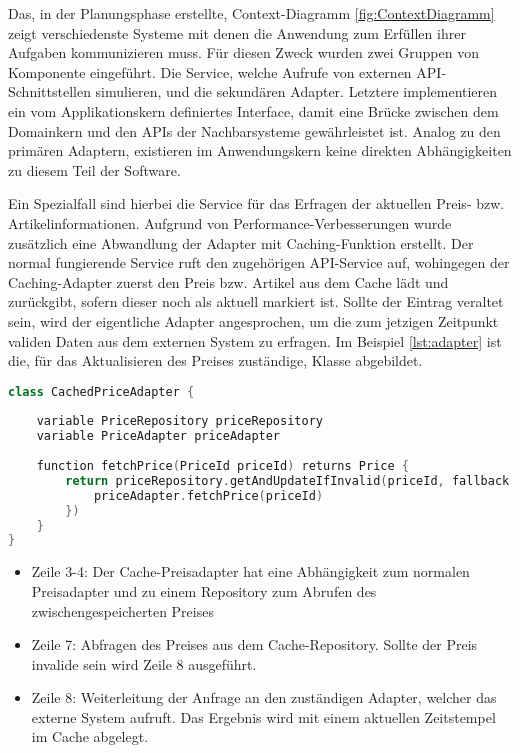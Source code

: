 Das, in der Planungsphase erstellte, Context-Diagramm \ref{fig:ContextDiagramm} zeigt verschiedenste Systeme mit denen die Anwendung zum Erfüllen ihrer Aufgaben kommunizieren muss. Für diesen Zweck wurden zwei Gruppen von Komponente eingeführt. Die Service, welche Aufrufe von externen API-Schnittstellen simulieren, und die sekundären Adapter. Letztere implementieren ein vom Applikationskern definiertes Interface, damit eine Brücke zwischen dem Domainkern und den APIs der Nachbarsysteme gewährleistet ist. Analog zu den primären Adaptern, existieren im Anwendungskern keine direkten Abhängigkeiten zu diesem Teil der Software.

Ein Spezialfall sind hierbei die Service für das Erfragen der aktuellen Preis- bzw. Artikelinformationen. Aufgrund von Performance-Verbesserungen wurde zusätzlich eine Abwandlung der Adapter mit Caching-Funktion erstellt. Der normal fungierende Service ruft den zugehörigen API-Service auf, wohingegen der Caching-Adapter zuerst den Preis bzw. Artikel aus dem Cache lädt und zurückgibt, sofern dieser noch als aktuell markiert ist. Sollte der Eintrag veraltet sein, wird der eigentliche Adapter angesprochen, um die zum jetzigen Zeitpunkt validen Daten aus dem externen System zu erfragen. Im Beispiel \ref{lst:adapter} ist die, für das Aktualisieren des Preises zuständige, Klasse  abgebildet.

\begin{minipage}{\linewidth} %
	\begin{lstlisting}[caption={Preisadapter mit Caching-Funktion}, label={lst:adapter}, language=Kotlin]
class CachedPriceAdapter {
	
	variable PriceRepository priceRepository 
	variable PriceAdapter priceAdapter
	
	function fetchPrice(PriceId priceId) returns Price {
		return priceRepository.getAndUpdateIfInvalid(priceId, fallback = {
			priceAdapter.fetchPrice(priceId)
		})
	}
}
	\end{lstlisting}
\end{minipage}

\begin{itemize}[noitemsep,nolistsep]
	\item Zeile 3-4: Der Cache-Preisadapter hat eine Abhängigkeit zum normalen Preisadapter und zu einem Repository zum Abrufen des zwischengespeicherten Preises
	\item Zeile 7: Abfragen des Preises aus dem Cache-Repository. Sollte der Preis invalide sein wird Zeile 8 ausgeführt.
	\item Zeile 8: Weiterleitung der Anfrage an den zuständigen Adapter, welcher das externe System aufruft. Das Ergebnis wird mit einem aktuellen Zeitstempel im Cache abgelegt.
\end{itemize}

